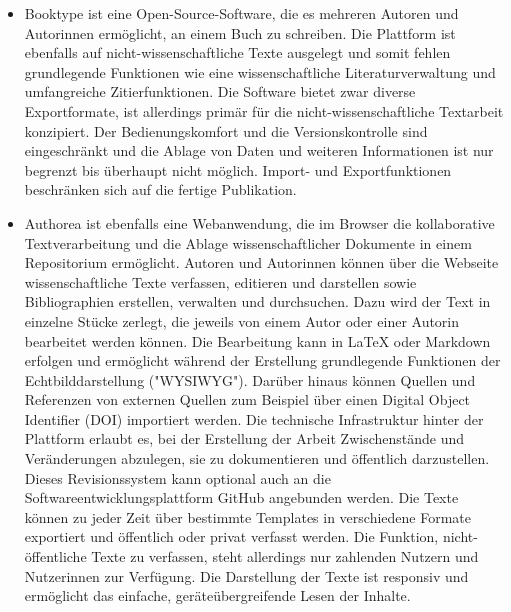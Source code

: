 \begin{itemize}
\item Booktype ist eine Open-Source-Software, die es mehreren Autoren und Autorinnen ermöglicht, an einem Buch zu schreiben. Die Plattform ist ebenfalls auf nicht-wissenschaftliche Texte ausgelegt und somit fehlen grundlegende Funktionen wie eine wissenschaftliche Literaturverwaltung und umfangreiche Zitierfunktionen. Die Software bietet zwar diverse Exportformate, ist allerdings primär für die nicht-wissenschaftliche Textarbeit konzipiert. Der Bedienungskomfort und die Versionskontrolle sind eingeschränkt und die Ablage von Daten und weiteren Informationen ist nur begrenzt bis überhaupt nicht möglich. Import- und Exportfunktionen beschränken sich auf die fertige Publikation.
\item Authorea ist ebenfalls eine Webanwendung, die im Browser die kollaborative Textverarbeitung und die Ablage wissenschaftlicher Dokumente in einem Repositorium ermöglicht. Autoren und Autorinnen können über die Webseite wissenschaftliche Texte verfassen, editieren und darstellen sowie Bibliographien erstellen, verwalten und durchsuchen. Dazu wird der Text in einzelne Stücke zerlegt, die jeweils von einem Autor oder einer Autorin bearbeitet werden können. Die Bearbeitung kann in LaTeX oder Markdown erfolgen und ermöglicht während der Erstellung grundlegende Funktionen der Echtbilddarstellung ("WYSIWYG"). Darüber hinaus können Quellen und Referenzen von externen Quellen zum Beispiel über einen Digital Object Identifier (DOI) importiert werden. Die technische Infrastruktur hinter der Plattform erlaubt es, bei der Erstellung der Arbeit Zwischenstände und Veränderungen abzulegen, sie zu dokumentieren und öffentlich darzustellen. Dieses Revisionssystem kann optional auch an die Softwareentwicklungsplattform GitHub angebunden werden. Die Texte können zu jeder Zeit über bestimmte Templates in verschiedene Formate exportiert und öffentlich oder privat verfasst werden. Die Funktion, nicht-öffentliche Texte zu verfassen, steht allerdings nur zahlenden Nutzern und Nutzerinnen zur Verfügung. Die Darstellung der Texte ist responsiv und ermöglicht das einfache, geräteübergreifende Lesen der Inhalte.

\end{itemize}
